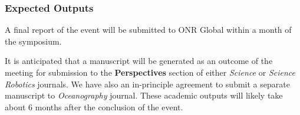 \subsubsection{Expected Outputs}

A final report of the event will be submitted to ONR Global
within a month of the symposium.

It is anticipated that a manuscript will be generated as an outcome of
the meeting for submission to the \textbf{Perspectives} section of
either \emph{Science} or \emph{Science Robotics} journals. We have
also an in-principle agreement to submit a separate manuscript to
\emph{Oceanography} journal. These academic outputs will likely take
about 6 months after the conclusion of the event. 

